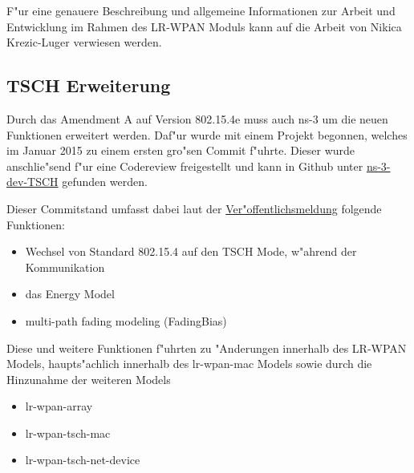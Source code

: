F"ur eine genauere Beschreibung und allgemeine Informationen zur Arbeit und
Entwicklung im Rahmen des LR-WPAN Moduls kann auf die Arbeit von
Nikica Krezic-Luger\cite{bachelorarbeit} verwiesen werden.

\subsection{TSCH Erweiterung}

Durch das Amendment A auf Version 802.15.4e muss auch ns-3 um die neuen
Funktionen erweitert werden. Daf"ur wurde mit einem Projekt begonnen, welches
im Januar 2015 zu einem ersten gro"sen Commit f"uhrte. Dieser wurde anschlie"send
f"ur eine Codereview freigestellt und kann in Github unter
\href{https://github.com/EIT-ICT-RICH/ns-3-dev-TSCH}{ns-3-dev-TSCH}
gefunden werden.

Dieser Commitstand umfasst dabei laut der
\href{http://mailman.isi.edu/pipermail/ns-developers/2015-January/012459.html}{Ver"offentlichsmeldung}
folgende Funktionen:

\begin{itemize}
  \item Wechsel von Standard 802.15.4 auf den TSCH Mode, w"ahrend der Kommunikation
  \item das Energy Model
  \item multi-path fading modeling (FadingBias)
\end{itemize}

Diese und weitere Funktionen f"uhrten zu "Anderungen innerhalb des LR-WPAN Models,
haupts"achlich innerhalb des lr-wpan-mac Models sowie durch die Hinzunahme
der weiteren Models

\begin{itemize}
  \item lr-wpan-array
  \item lr-wpan-tsch-mac
  \item lr-wpan-tsch-net-device
\end{itemize}

